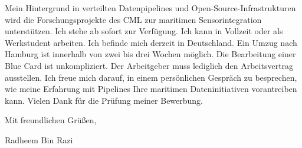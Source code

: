 \documentclass[11pt,a4paper]{coverletter}
\begin{document}
Mein Hintergrund in verteilten Datenpipelines und Open-Source-Infrastrukturen wird die Forschungsprojekte des CML zur maritimen Sensorintegration unterstützen. Ich stehe ab sofort zur Verfügung. Ich kann in Vollzeit oder als Werkstudent arbeiten. Ich befinde mich derzeit in Deutschland. Ein Umzug nach Hamburg ist innerhalb von zwei bis drei Wochen möglich. Die Bearbeitung einer Blue Card ist unkompliziert. Der Arbeitgeber muss lediglich den Arbeitsvertrag ausstellen. Ich freue mich darauf, in einem persönlichen Gespräch zu besprechen, wie meine Erfahrung mit Pipelines Ihre maritimen Dateninitiativen vorantreiben kann. Vielen Dank für die Prüfung meiner Bewerbung.

\closing{Mit freundlichen Grüßen,}{Radheem Bin Razi}
\end{document}
